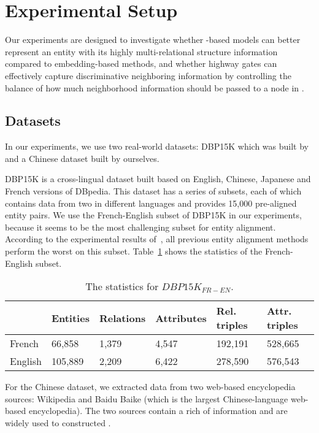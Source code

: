 \section{Experimental Setup}
	Our experiments are designed to investigate whether \RGCN-based models can better represent an entity with its highly multi-relational
structure information compared to \KG embedding-based methods, and whether highway gates can effectively capture discriminative neighboring
information by controlling the balance of how much neighborhood information should be passed to a node in \RGCN.

\subsection{Datasets}
\label{subsection:datasets}
	In our experiments, we use two real-world datasets: DBP15K which was built by~\cite{sun2017cross} and a Chinese dataset built by ourselves. 
	
	DBP15K is a cross-lingual dataset built based on English, Chinese, Japanese and French versions of DBpedia. 
	This dataset has a series of subsets, each of which contains data from two \KGs in different languages and provides 15,000 pre-aligned entity pairs. 
	We use the French-English subset of DBP15K in our experiments, because it seems to be the most challenging subset for entity alignment. 
	According to the experimental results of~\cite{sun2017cross}, all previous entity alignment methods perform the worst on this subset. Table~\ref{dbp} shows the statistics of the French-English subset.
	
	\begin{table}
		\centering
		\scriptsize
		\begin{tabular}{l|lllll}
			\toprule
			& Entities & Relations & Attributes & Rel. triples & Attr. triples \\
			\midrule
			French & 66,858 & 1,379 & 4,547 & 192,191 & 528,665 \\ 
			English & 105,889 & 2,209 & 6,422 & 278,590 & 576,543 \\
			\bottomrule
		\end{tabular}
	    \caption{The statistics for $DBP15K_{FR-EN}$.}
	    \label{dbp}
	\end{table}
	
    For the Chinese dataset, we extracted data from two web-based encyclopedia sources: Wikipedia and Baidu Baike (which is the largest Chinese-language web-based encyclopedia). 
    The two sources contain a rich of information and are widely used to constructed \KGs.
	

